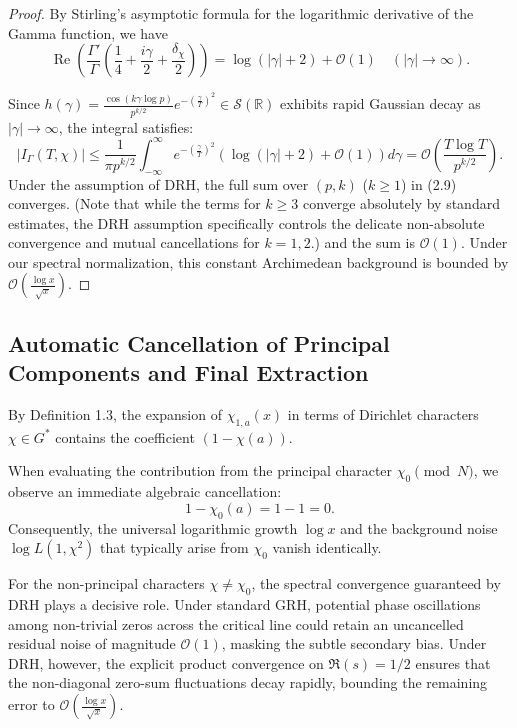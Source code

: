 \documentclass[12pt,reqno]{amsart}
\theoremstyle{definition}
\theoremstyle{remark}
\numberwithin{equation}{section}
\begin{document}
\begin{proof}
By Stirling's asymptotic formula for the logarithmic derivative of the Gamma function, we have 
\[
\operatorname{Re} \left( \frac{\Gamma'}{\Gamma} \left( \frac{1}{4} + \frac{i\gamma}{2} + \frac{\delta_\chi}{2} \right) \right) = \log (|\gamma| + 2) + \mathcal{O}(1)\quad(|\gamma| \to \infty).
\]

Since $h(\gamma) = \frac{\cos(k \gamma \log p)}{p^{k/2}} e^{-\left(\frac{\gamma}{T}\right)^2} \in \mathcal{S}(\mathbb{R})$ exhibits rapid Gaussian decay as $|\gamma| \to \infty$, the integral satisfies:
\begin{equation}
|I_{\Gamma}(T, \chi)| \le \frac{1}{\pi p^{k/2}} \int_{-\infty}^{\infty} e^{-\left(\frac{\gamma}{T}\right)^2} (\log (|\gamma| + 2) + \mathcal{O}(1)) d\gamma = \mathcal{O}\left( \frac{T \log T}{p^{k/2}} \right).
\end{equation}
Under the assumption of DRH, the full sum over $(p, k)$ ($k \ge 1$) in (2.9) converges. (Note that while the terms for $k \ge 3$ converge absolutely by standard estimates, the DRH assumption specifically controls the delicate non-absolute convergence and mutual cancellations for $k=1, 2$.)
and the sum is $\mathcal O(1)$.
Under our spectral normalization, this constant Archimedean background is bounded by $\mathcal{O}(\frac{\log x}{\sqrt x})$.
\end{proof}

\subsection{Automatic Cancellation of Principal Components and Final Extraction}
By Definition 1.3, the expansion of $\chi_{1,a}(x)$ in terms of Dirichlet characters $\chi \in G^*$ contains the coefficient $(1 - \chi(a))$.

When evaluating the contribution from the principal character $\chi_0 \pmod N$, we observe an immediate algebraic cancellation:
\[
1 - \chi_0(a) = 1 - 1 = 0. \tag{2.10}
\]
Consequently, the universal logarithmic growth $\log x$ and the background noise $\log L(1, \chi^2)$ that typically arise from $\chi_0$ vanish identically.

For the non-principal characters $\chi \neq \chi_0$, the spectral convergence guaranteed by DRH plays a decisive role. Under standard GRH, potential phase oscillations among non-trivial zeros across the critical line could retain an uncancelled residual noise of magnitude $\mathcal{O}(1)$, masking the subtle secondary bias. Under DRH, however, the explicit product convergence on $\Re(s) = 1/2$ ensures that the non-diagonal zero-sum fluctuations decay rapidly, bounding the remaining error to $\mathcal{O}\left( \frac{\log x}{\sqrt{x}} \right)$.
\end{document}
